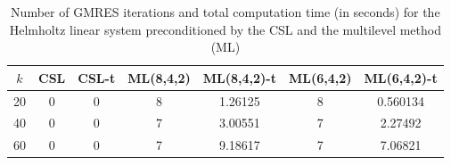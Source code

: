 \begin{table}[t]
\centering
\begin{tabular}{ccccccc}
\hline
$k$ & CSL & CSL-t & ML(8,4,2) & ML(8,4,2)-t& ML(6,4,2) & ML(6,4,2)-t \\ \hline
20 & 0 & 0 & 8 & 1.26125 & 8 & 0.560134 \\
40 & 0 & 0 & 7 & 3.00551 & 7 & 2.27492 \\
60 & 0 & 0 & 7 & 9.18617 & 7 & 7.06821 \\
\hline
\end{tabular}
\caption{Number of GMRES iterations and total computation time (in seconds) for the Helmholtz linear system preconditioned by the  CSL and the multilevel method (ML)}
\label{table:mlgmres_csl_vs_adef_coarse_eps_10}
\end{table}

